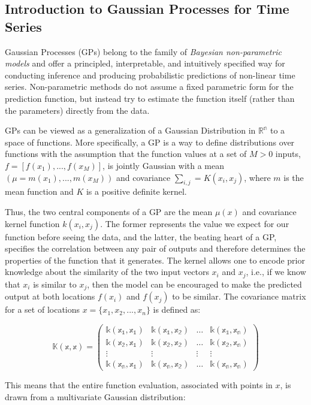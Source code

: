\subsection{Introduction to Gaussian Processes for Time Series}

Gaussian Processes (GPs) belong to the family of \textit{Bayesian non-parametric models} and offer a principled, interpretable, and intuitively specified way for conducting inference and producing probabilistic predictions of non-linear time series. Non-parametric methods do not assume a fixed parametric form for the prediction function, but instead try to estimate the function itself (rather than the parameters) directly from the data. 

GPs can be viewed as a generalization of a Gaussian Distribution in $\mathbb{R^n}$ to a space of functions. More specifically, a GP is a way to define distributions over functions with the assumption that the function values at a set of $M > 0$ inputs, $f = [f(x_1), . . .,f(x_M)]$, is jointly Gaussian with a mean $(\mu = m(x_1), . . .,m(x_M))$ and covariance $\sum_{i, j} = K(x_i, x_j)$, where $m$ is the mean function and $K$ is a positive definite kernel.

Thus, the two central components of a GP are the mean $\mu(x)$ and covariance kernel function $k(x_i, x_j)$. The former represents the value we expect for our function before seeing the data, and the latter, the beating heart of a GP, specifies the correlation between any pair of outputs and therefore determines the properties of the function that it generates. The kernel allows one to encode prior knowledge about the similarity of the two input vectors $x_i$ and $x_j$, i.e., if we know that $x_i$ is similar to $x_j$, then the model can be encouraged to make the predicted output at both locations $f(x_i)$ and $f(x_j)$ to be similar. The covariance matrix for a set of locations $x = \{x_1, x_2, . . .,x_n\}$ is defined as:

$$\mathbb{K(x, x) = \begin{pmatrix}
k(x_1, x_1) & k(x_1, x_2) & \dots & k(x_1, x_n) \\
k(x_2, x_1) & k(x_2, x_2) & \dots & k(x_2, x_n) \\
\vdots & \vdots & \vdots & \vdots \\
k(x_n, x_1) & k(x_n, x_2) & \dots & k(x_n, x_n)
\end{pmatrix}}$$

This means that the entire function evaluation, associated with points in $x$, is drawn from a multivariate Gaussian distribution:

